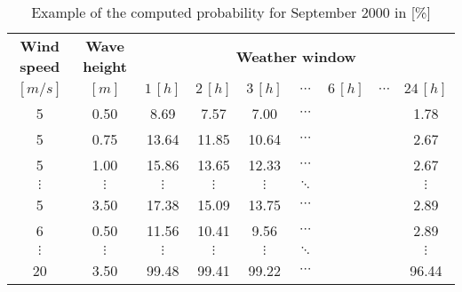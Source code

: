 \begin{table}
\label{tab:proba}
\begin{tabular}{ccccccccc}
\hline
{\bf Wind speed} & {\bf Wave height} & \multicolumn{ 7}{c}{{\bf Weather window}} \\
$[m/s]$      &      $[m]$      &          $1\, [h]$ &          $2\, [h]$ &          $3\, [h]$ &  $\cdots$ & $6\, [h]$  & $\cdots$ &        $24\, [h]$ \\
\hline
5 &       0.50 &       8.69 &       7.57 &       7.00 &  $\cdots$ & & &      1.78 \\
5 &       0.75 &      13.64 &      11.85 &      10.64 &  $\cdots$ & & &      2.67 \\
5 &       1.00 &      15.86 &      13.65 &      12.33 &  $\cdots$ & & &      2.67 \\
 $\vdots$ &  $\vdots$ &  $\vdots$ &  $\vdots$ &  $\vdots$ &  $\ddots$ & & &  $\vdots$ \\
5 &       3.50 &      17.38 &      15.09 &      13.75 &  $\cdots$ & & &       2.89 \\
6 &       0.50 &      11.56 &      10.41 &       9.56 &  $\cdots$ & & &      2.89 \\
 $\vdots$ &  $\vdots$ &  $\vdots$ &  $\vdots$ &  $\vdots$ & $\ddots$ & &         &  $\vdots$ \\
20 &       3.50 &      99.48 &      99.41 &      99.22 &  $\cdots$ & & &      96.44 \\
\hline
\end{tabular}  

\caption{Example of the computed probability for September 2000 in [\%]}
\end{table}